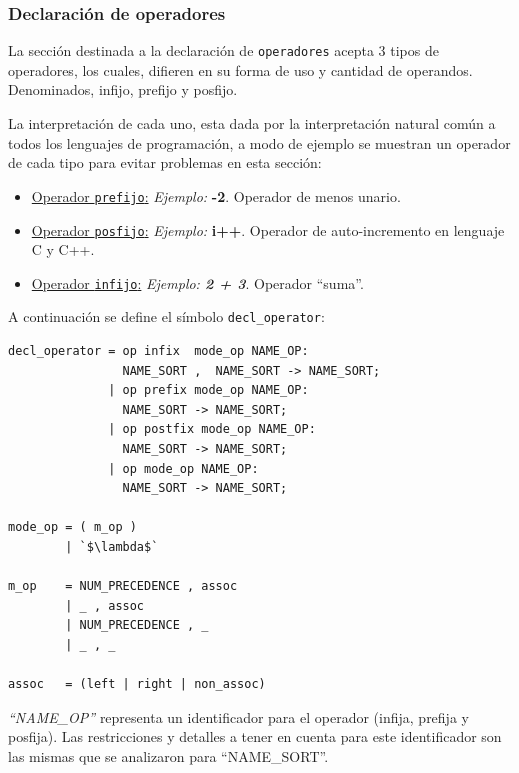 \subsubsection{Declaración de operadores}
La sección destinada a la declaración de \texttt{operadores} acepta 3 tipos de operadores, los cuales, difieren en su forma de uso y cantidad de operandos. Denominados, infijo, prefijo y posfijo. 

La interpretación de cada uno, esta dada por la interpretación natural común a todos los lenguajes de programación, a modo de ejemplo se muestran un operador de cada tipo para evitar problemas en esta sección:

\begin{itemize}
\item \underline{Operador \texttt{prefijo}:} \textit{Ejemplo:} \textbf{-2}. Operador de menos unario. 

\item \underline{Operador \texttt{posfijo}:} \textit{Ejemplo:} \textbf{i++}. Operador de auto-incremento en lenguaje C y C++.

\item \underline{Operador \texttt{infijo}:} \textit{Ejemplo: \textbf{2 + 3}}. Operador ``suma''.
\end{itemize}

A continuación se define el símbolo \texttt{decl\_operator}:

\begin{lstlisting}[frame=shadowbox, rulesepcolor=\color{azul}, language=specmag ]
decl_operator = op infix  mode_op NAME_OP:
                NAME_SORT ,  NAME_SORT -> NAME_SORT;
              | op prefix mode_op NAME_OP:
                NAME_SORT -> NAME_SORT;
              | op postfix mode_op NAME_OP:
                NAME_SORT -> NAME_SORT;
              | op mode_op NAME_OP:
                NAME_SORT -> NAME_SORT;

mode_op = ( m_op )
        | `$\lambda$`

m_op    = NUM_PRECEDENCE , assoc
        | _ , assoc
        | NUM_PRECEDENCE , _
        | _ , _

assoc   = (left | right | non_assoc)
\end{lstlisting}
\vspace{0.3cm}


\textit{``NAME\_OP''} representa un identificador para el operador (infija, prefija y posfija). Las restricciones y detalles a tener en cuenta para este identificador son las mismas que se analizaron para ``NAME\_SORT''.

